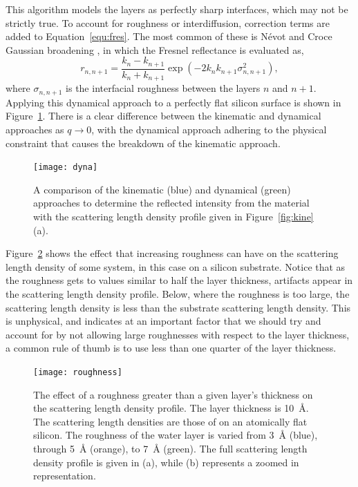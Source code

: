 \documentclass[
 reprint,
 superscriptaddress,
 amsmath,amssymb,
 aps,
]{revtex4-1}
\newcommand{\angstrom}{\rm{\AA}}
\begin{document}
This algorithm models the layers as perfectly sharp interfaces, which may not be strictly true.
To account for roughness or interdiffusion, correction terms are added to Equation~\ref{equ:fres}.
The most common of these is N\'{e}vot and Croce Gaussian broadening \cite{nevot_caracterisation_1980}, in which the Fresnel reflectance is evaluated as,
%
\begin{equation}
    r_{n, n+1} = \frac{k_n - k_{n+1}}{k_n + k_{n+1}} \exp{(-2k_nk_{n+1}\sigma^2_{n,n+1})},
\end{equation}
%
where $\sigma_{n, n+1}$ is the interfacial roughness between the layers $n$ and $n+1$.
Applying this dynamical approach to a perfectly flat silicon surface is shown in Figure~\ref{fig:dyna}.
There is a clear difference between the kinematic and dynamical approaches as $q \to 0$, with the dynamical approach adhering to the physical constraint that causes the breakdown of the kinematic approach. %
%
\begin{figure}[t]
    \texttt{[image: dyna]}
    \caption{A comparison of the kinematic (blue) and dynamical (green) approaches to determine the reflected intensity from the material with the scattering length density profile given in Figure~\ref{fig:kine}(a).}
    \label{fig:dyna}
\end{figure}
%

Figure~\ref{fig:rough} shows the effect that increasing roughness can have on the scattering length density of some system, in this case  on a silicon substrate.
Notice that as the roughness gets to values similar to half the layer thickness, artifacts appear in the scattering length density profile.
Below, where the roughness is too large, the scattering length density is less than the substrate scattering length density.
This is unphysical, and indicates at an important factor that we should try and account for by not allowing large roughnesses with respect to the layer thickness, a common rule of thumb is to use less than one quarter of the layer thickness.
%
\begin{figure}[t]
    \texttt{[image: roughness]}
    \caption{The effect of a roughness greater than a given layer's thickness on the scattering length density profile. The layer thickness is \SI{10}{\angstrom}. The scattering length densities are those of  on an atomically flat silicon. The roughness of the water layer is varied from \SI{3}{\angstrom} (blue), through \SI{5}{\angstrom} (orange), to \SI{7}{\angstrom} (green). The full scattering length density profile is given in (a), while (b) represents a zoomed in representation.}
    \label{fig:rough}
\end{figure}
%
\end{document}
